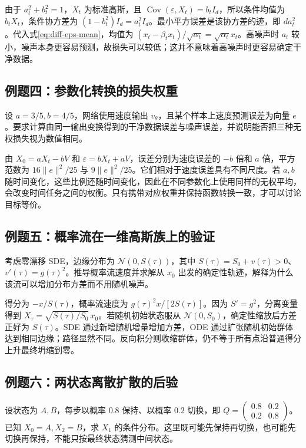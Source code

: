 \documentclass[UTF8,12pt,a4paper,fontset=fandol]{ctexart}
\begin{document}
\begin{solve}
由于 $a_t^2+b_t^2=1$，$X_t$ 为标准高斯，且 $\operatorname{Cov}(\varepsilon,X_t)=b_tI_d$，所以条件均值为 $b_tX_t$，条件协方差为 $(1-b_t^2)I_d=a_t^2I_d$。最小平方误差是该协方差的迹，即 $d a_t^2$。代入式\eqref{eq:diff-eps-mean}，均值为 $(x_t-\beta_tx_t)/\sqrt{\alpha_t}=\sqrt{\alpha_t}x_t$。高噪声时 $a_t$ 较小，噪声本身更容易预测，故损失可以较低；这并不意味着高噪声时更容易确定干净数据。
\end{solve}

\subsection{例题四：参数化转换的损失权重}
设 $a=3/5,b=4/5$，网络使用速度输出 $v_\theta$，且某个样本上速度预测误差为向量 $e$。要求计算由同一输出变换得到的干净数据误差与噪声误差，并说明能否把三种无权损失视为数值相同。

\begin{solve}
由 $X_0=aX_t-bV$ 和 $\varepsilon=bX_t+aV$，误差分别为速度误差的 $-b$ 倍和 $a$ 倍，平方范数为 $16\|e\|^2/25$ 与 $9\|e\|^2/25$。它们相对于速度误差具有不同尺度。若 $a,b$ 随时间变化，这些比例还随时间变化，因此在不同参数化上使用同样的无权平均，会改变时间任务之间的权衡。只有携带对应权重并保持函数转换一致，才可以讨论目标等价。
\end{solve}

\subsection{例题五：概率流在一维高斯族上的验证}
考虑零漂移 SDE，边缘分布为 $\mathcal N(0,S(\tau))$，其中 $S(\tau)=S_0+v(\tau)>0$、$v'(\tau)=g(\tau)^2$。推导概率流速度并求解从 $x_0$ 出发的确定性轨迹，解释为什么该流可以增加分布方差而不用随机噪声。

\begin{solve}
得分为 $-x/S(\tau)$，概率流速度为 $g(\tau)^2x/[2S(\tau)]$。因为 $S'=g^2$，分离变量得到 $X_\tau=\sqrt{S(\tau)/S_0}\,x_0$。若随机初始状态服从 $\mathcal N(0,S_0)$，确定性缩放后方差正好为 $S(\tau)$。SDE 通过新增随机增量增加方差，ODE 通过扩张随机初始群体达到相同边缘；路径显然不同。反向积分则收缩群体，仍不等于所有点沿普通得分上升最终坍缩到零。
\end{solve}

\subsection{例题六：两状态离散扩散的后验}
设状态为 $A,B$，每步以概率 $0.8$ 保持、以概率 $0.2$ 切换，即 $Q=\begin{pmatrix}0.8&0.2\\0.2&0.8\end{pmatrix}$。已知 $X_0=A,X_2=B$，求 $X_1$ 的条件分布。这里既可能先保持再切换，也可能先切换再保持，不能只按最终状态猜测中间状态。
\end{document}
